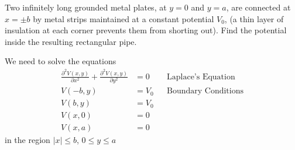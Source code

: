 \documentclass[../main.tex]{subfiles}
\begin{document}
\begin{questions}
	\question Two infinitely long grounded metal plates, at $y = 0$ and $y = a$, are connected at $x = \pm b$ by metal strips maintained at a constant potential $V_0$, (a thin layer of insulation at each corner prevents them from shorting out). Find the potential inside the resulting rectangular pipe. \label{q:q1}

	\begin{solution}
		We need to solve the equations
		\begin{align}
			\frac{\partial^2 V(x,y)}{\partial x^2} + \frac{\partial^2 V(x,y)}{\partial y^2} &= 0 && \text{Laplace's Equation}\\
			V(-b,y) &= V_0 && \text{Boundary Conditions}\label{eq:bc1}\\
			V(b,y) &= V_0\label{eq:bc2}\\
			V(x,0) &= 0\label{eq:bc3}\\
			V(x,a) &= 0\label{eq:bc4}
		\end{align}
		in the region $|x| \leq b$, $0\leq y\leq a$


\end{solution}
\end{questions}
\end{document}
